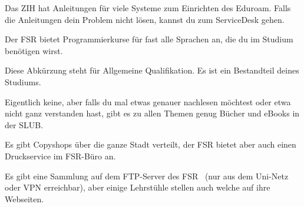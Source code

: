 Das ZIH hat Anleitungen für viele Systeme zum Einrichten des Eduroam. Falls die Anleitungen dein Problem nicht lösen, kannst du zum ServiceDesk gehen.

Der FSR bietet Programmierkurse für fast alle Sprachen an, die du im Studium benötigen wirst. 

\label{minisec:faq}

Diese Abkürzung steht für Allgemeine Qualifikation. Es ist ein Bestandteil deines Studiums.~

Eigentlich keine, aber falls du mal etwas genauer nachlesen möchtest oder etwa nicht ganz verstanden hast, gibt es zu allen Themen genug Bücher und eBooks in der SLUB.

Es gibt Copyshops über die ganze Stadt verteilt, der FSR bietet aber auch einen Druckservice im FSR-Büro an.

Es gibt eine Sammlung auf dem FTP-Server des FSR~ (nur aus dem Uni-Netz oder VPN erreichbar), aber einige Lehrstühle stellen auch welche auf ihre Webseiten.
